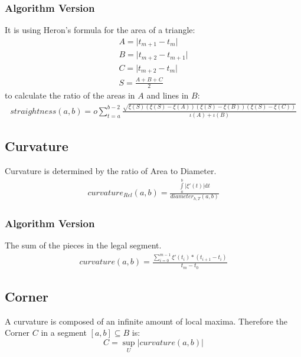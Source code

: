 \documentclass{report}
\newcommand\norm[1]{\left\lVert#1\right\rVert}
\begin{document}
\subsubsection{Algorithm Version}
It is using Heron's formula for the area of a triangle:
\begin{align*}
A=\lvert t_{m+1}-t_{m} \rvert\\
B=\lvert t_{m+2} - t_{m+1} \rvert\\
C=\lvert t_{m+2} - t_{m} \rvert\\
S=\frac{A+B+C}{2}
\end{align*}
to calculate the ratio of the areas in $A$ and lines in $B$:
\begin{align}
straightness(a,b)=o \sum_{t=a}^{b-2}\frac{\sqrt{\xi(S)(\xi(S)-\xi(A))(\xi(S)-\xi(B))(\xi(S)-\xi(C))}}{\iota(A)+\iota(B)}
\end{align}

\subsection{Curvature}
\iffalse
Because the diameter has to be calculated piece-wise, we have to set up a vector space with the turns $P_{n},P_{n+1} \in T$.
\begin{equation}
v \in (B,\norm{\cdot})
\end{equation}
Note: It is a Banach space.\\
\fi
Curvature is determined by the ratio of Area to Diameter.
\begin{align}
curvature_{Rel}(a,b) = \frac{\int \limits _{a}^{b} \lvert \xi'(t) \rvert \mathrm{d}t}{diameter_{h,T}(a,b)}
\end{align}
\subsubsection{Algorithm Version}
The sum of the pieces in the legal segment.
\begin{align}
curvature(a,b)= \frac{\sum \limits _{i=0}^{m-1}\xi'(t_{i})*(t_{i+1}-t_{i})}{t_{m}-t_{0}}
\end{align}

\subsection{Corner}
A curvature is composed of an infinite amount of local maxima. Therefore the Corner $C$ in a segment $[a,b] \subseteq B$ is:
\begin{equation}
C = \sup_{U}\lvert curvature(a,b) \rvert
\end{equation}
\end{document}
